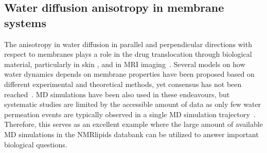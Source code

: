 \documentclass[fleqn,10pt]{wlscirep}
\begin{document}
\subsection{Water diffusion anisotropy in membrane systems}
The anisotropy in water diffusion in parallel and perpendicular directions with respect to membranes plays a role in the drug translocation through biological material, particularly in skin \cite{hansen13,wen18,nitsche19,roberts21}, and in MRI imaging~\cite{topgaard20}. Several models on how water dynamics depends on membrane properties have been proposed based on different experimental and theoretical methods, yet consensus 
has not been reached~\cite{mathai07,nitsche13,nitsche16,shinoda16,venable19,frallicciardi22}. MD simulations have been also used in these endeavours, but systematic studies are limited by the accessible amount of data as only few water permeation events are typically observed in a single MD simulation trajectory~\cite{venable19,camilo2022}. Therefore, this serves as an excellent example where the large amount of available MD simulations in the NMRlipids databank can be utilized to answer important biological questions.
\end{document}
